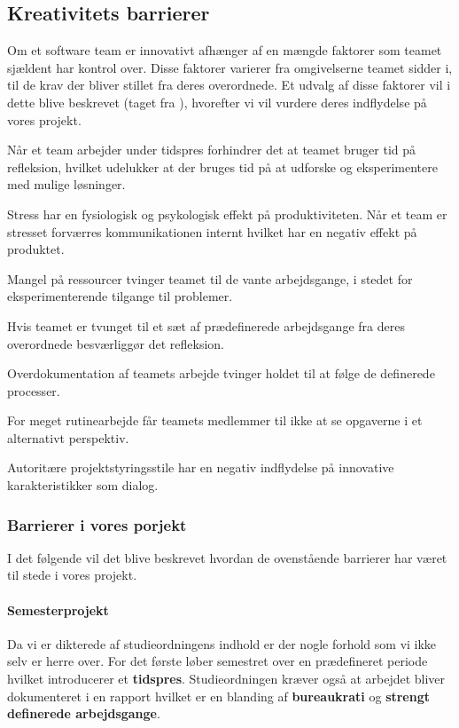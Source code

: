 \subsection{Kreativitets barrierer}
Om et software team er innovativt afhænger af en mængde faktorer som teamet sjældent har kontrol over.
Disse faktorer varierer fra omgivelserne teamet sidder i, til de krav der bliver stillet fra deres overordnede.
Et udvalg af disse faktorer vil i dette blive beskrevet (taget fra \citet[s.~81-82]{book:softwareinnovation}), hvorefter vi vil vurdere deres indflydelse på vores projekt.

\begin{description}[style=nextline]
	\item[Tidspres] Når et team arbejder under tidspres forhindrer det at teamet bruger tid på refleksion, hvilket udelukker at der bruges tid på at udforske og eksperimentere med mulige løsninger.
	\item[Stress] Stress har en fysiologisk og psykologisk effekt på produktiviteten. Når et team er stresset forværres kommunikationen internt hvilket har en negativ effekt på produktet.
	\item[Ressource mangel] Mangel på ressourcer tvinger teamet til de vante arbejdsgange, i stedet for eksperimenterende tilgange til problemer.
	\item[Strengt definerede arbejdsgange] Hvis teamet er tvunget til et sæt af prædefinerede arbejdsgange fra deres overordnede besværliggør det refleksion.
	\item[Bureaukrati] Overdokumentation af teamets arbejde tvinger holdet til at følge de definerede processer.
	\item[Rutinearbejde] For meget rutinearbejde får teamets medlemmer til ikke at se opgaverne i et alternativt perspektiv.
	\item[Dårlig projektstyring] Autoritære projektstyringsstile har en negativ indflydelse på innovative karakteristikker som dialog.
\end{description}

\subsubsection{Barrierer i vores porjekt}
I det følgende vil det blive beskrevet hvordan de ovenstående barrierer har været til stede i vores projekt.


\paragraph{Semesterprojekt}
Da vi er dikterede af studieordningens indhold er der nogle forhold som vi ikke selv er herre over.
For det første løber semestret over en prædefineret periode hvilket introducerer et \textbf{tidspres}.
Studieordningen kræver også at arbejdet bliver dokumenteret i en rapport hvilket er en blanding af \textbf{bureaukrati} og \textbf{strengt definerede arbejdsgange}.

